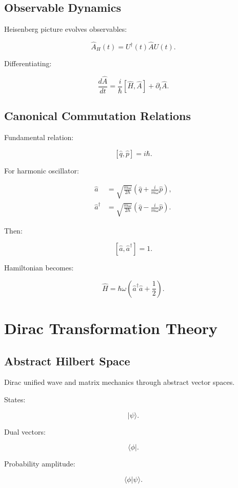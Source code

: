 \documentclass[11pt]{book}
\begin{document}
\section{Observable Dynamics}

Heisenberg picture evolves observables:

\[
\hat A_H(t)
=
U^\dagger(t)\hat A U(t).
\]

Differentiating:

\[
\frac{d\hat A}{dt}
=
\frac{i}{\hbar}[\hat H,\hat A]
+
\partial_t \hat A.
\]

\section{Canonical Commutation Relations}

Fundamental relation:

\[
[\hat q,\hat p]=i\hbar.
\]

For harmonic oscillator:

\begin{align}
\hat a &= \sqrt{\frac{m\omega}{2\hbar}}\left(\hat q+\frac{i}{m\omega}\hat p\right),\\
\hat a^\dagger &= \sqrt{\frac{m\omega}{2\hbar}}\left(\hat q-\frac{i}{m\omega}\hat p\right).
\end{align}

Then:

\[
[\hat a,\hat a^\dagger]=1.
\]

Hamiltonian becomes:

\[
\hat H
=
\hbar\omega
\left(
\hat a^\dagger\hat a+\frac12
\right).
\]

\chapter{Dirac Transformation Theory}

\section{Abstract Hilbert Space}

Dirac unified wave and matrix mechanics through abstract vector spaces.

States:

\[
|\psi\rangle.
\]

Dual vectors:

\[
\langle \phi|.
\]

Probability amplitude:

\[
\langle \phi|\psi\rangle.
\]
\end{document}
